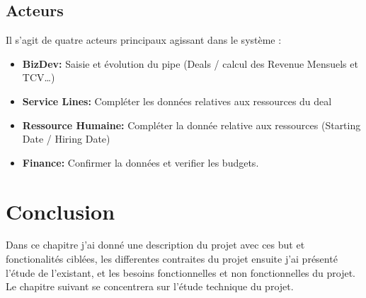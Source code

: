 \subsection{Acteurs}
Il s’agit de quatre acteurs principaux agissant dans le système :
\\
\begin{itemize}
    \item \textbf{BizDev:} Saisie et évolution du pipe (Deals / calcul des Revenue Mensuels
et TCV…)
    \item \textbf{Service Lines:} Compléter les données relatives aux ressources du deal 
    \item \textbf{Ressource Humaine:} Compléter la donnée relative aux ressources (Starting Date / Hiring
Date)
    \item \textbf{Finance:} Confirmer la données et verifier les budgets.
\end{itemize}


\section{Conclusion}

Dans ce chapitre j’ai donné une description du projet avec ces but et fonctionalités ciblées, les differentes contraites du projet ensuite j'ai présenté l’étude de l’existant, et les besoins fonctionnelles et non fonctionnelles du projet. 
\\
Le chapitre suivant se concentrera sur l’étude technique du projet.

